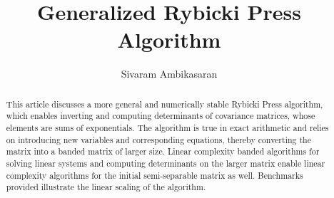 \documentclass[times]{nlaauth}
\begin{document}

\title{Generalized Rybicki Press Algorithm\footnotemark[2]}

\author{Sivaram Ambikasaran}

\address{Courant Institute of Mathematical Sciences, 251, Mercer Street, New York, NY 10012}


\begin{abstract}
This article discusses a more general and numerically stable Rybicki Press algorithm, which enables inverting and computing determinants of covariance matrices, whose elements are sums of exponentials. The algorithm is true in exact arithmetic and relies on introducing new variables and corresponding equations, thereby converting the matrix into a banded matrix of larger size. Linear complexity banded algorithms for solving linear systems and computing determinants on the larger matrix enable linear complexity algorithms for the initial semi-separable matrix as well. Benchmarks provided illustrate the linear scaling of the algorithm.
\end{abstract}


\maketitle


\vspace{-6pt}
\end{document}

